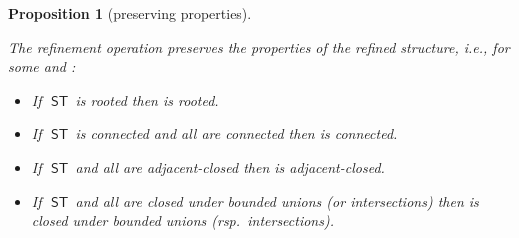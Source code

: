 \documentclass[submission,copyright,creativecommons]{eptcs}
\newtheorem{proposition}[theorem]{Proposition}
\newcommand\ST{\ensuremath{\mathsf{ST}}}
\begin{document}
\begin{proposition}[preserving properties]\label{def_ref3}\ 

The refinement operation preserves the properties of the refined structure, i.e., for some  and :
\begin{itemize}
\item If\,\ \ST\ is rooted then  is rooted.
\item If\,\ \ST\ is connected and all  are connected then  is connected.
\item If\,\ \ST\ and all  are adjacent-closed then  is adjacent-closed.
\item If\,\ \ST\ and all  are closed under bounded unions (or intersections) then  is closed under bounded unions (rsp.\ intersections).
\end{itemize}
\end{proposition}
\end{document}

